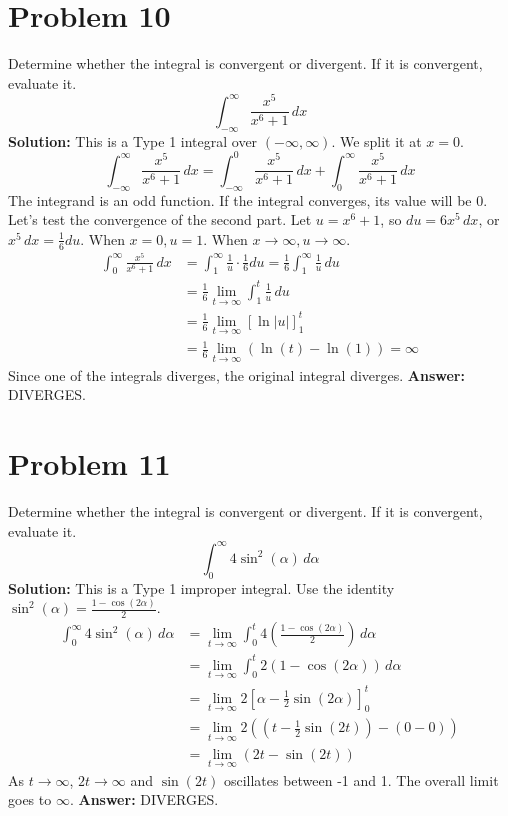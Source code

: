 \documentclass{article}
\begin{document}
\section{Problem 10}
Determine whether the integral is convergent or divergent. If it is convergent, evaluate it.
\[ \int_{-\infty}^{\infty} \frac{x^5}{x^6+1} \,dx \]
\textbf{Solution:}
This is a Type 1 integral over $(-\infty, \infty)$. We split it at $x=0$.
\[ \int_{-\infty}^{\infty} \frac{x^5}{x^6+1} \,dx = \int_{-\infty}^{0} \frac{x^5}{x^6+1} \,dx + \int_{0}^{\infty} \frac{x^5}{x^6+1} \,dx \]
The integrand is an odd function. If the integral converges, its value will be 0. Let's test the convergence of the second part. Let $u = x^6+1$, so $du=6x^5\,dx$, or $x^5\,dx = \frac{1}{6}du$. When $x=0, u=1$. When $x \to \infty, u \to \infty$.
\begin{align*}
    \int_{0}^{\infty} \frac{x^5}{x^6+1} \,dx &= \int_{1}^{\infty} \frac{1}{u} \cdot \frac{1}{6}du = \frac{1}{6} \int_{1}^{\infty} \frac{1}{u} \,du \\
    &= \frac{1}{6} \lim_{t \to \infty} \int_{1}^{t} \frac{1}{u} \,du \\
    &= \frac{1}{6} \lim_{t \to \infty} [\ln|u|]_1^t \\
    &= \frac{1}{6} \lim_{t \to \infty} (\ln(t) - \ln(1)) = \infty
\end{align*}
Since one of the integrals diverges, the original integral diverges.
\textbf{Answer:} DIVERGES.

\section{Problem 11}
Determine whether the integral is convergent or divergent. If it is convergent, evaluate it.
\[ \int_{0}^{\infty} 4\sin^2(\alpha) \,d\alpha \]
\textbf{Solution:}
This is a Type 1 improper integral. Use the identity $\sin^2(\alpha) = \frac{1 - \cos(2\alpha)}{2}$.
\begin{align*}
    \int_{0}^{\infty} 4\sin^2(\alpha) \,d\alpha &= \lim_{t \to \infty} \int_{0}^{t} 4 \left( \frac{1 - \cos(2\alpha)}{2} \right) \,d\alpha \\
    &= \lim_{t \to \infty} \int_{0}^{t} 2(1 - \cos(2\alpha)) \,d\alpha \\
    &= \lim_{t \to \infty} 2 \left[ \alpha - \frac{1}{2}\sin(2\alpha) \right]_{0}^{t} \\
    &= \lim_{t \to \infty} 2 \left( \left(t - \frac{1}{2}\sin(2t)\right) - (0 - 0) \right) \\
    &= \lim_{t \to \infty} (2t - \sin(2t))
\end{align*}
As $t \to \infty$, $2t \to \infty$ and $\sin(2t)$ oscillates between -1 and 1. The overall limit goes to $\infty$.
\textbf{Answer:} DIVERGES.
\end{document}
